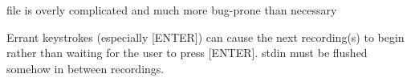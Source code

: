 
\begin{DoxyRefList}
\item[\label{bug__bug000001}%
\hypertarget{bug__bug000001}{}%
File \hyperlink{fileio_8hpp}{fileio.hpp} ]file is overly complicated and much more bug-\/prone than necessary  
\item[\label{bug__bug000002}%
\hypertarget{bug__bug000002}{}%
File \hyperlink{main_8cpp}{main.cpp} ]Errant keystrokes (especially \mbox{[}E\+N\+T\+E\+R\mbox{]}) can cause the next recording(s) to begin rather than waiting for the user to press \mbox{[}E\+N\+T\+E\+R\mbox{]}. stdin must be flushed somehow in between recordings. 
\end{DoxyRefList}